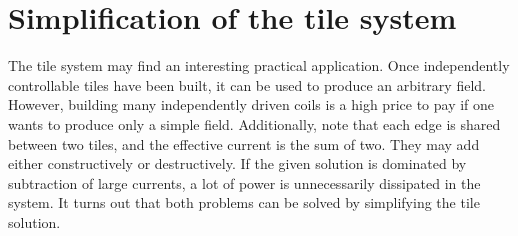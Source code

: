 

\section{Simplification of the tile system}
The tile system may find an interesting practical application. Once independently controllable tiles have been built, it can be used to produce an arbitrary field. However, building many independently driven coils is a high price to pay if one wants to produce only a simple field. Additionally, note that each edge is shared between two tiles, and the effective current is the sum of two. They may add either constructively or destructively. If the given solution is dominated by subtraction of large currents, a lot of power is unnecessarily dissipated in the system. It turns out that both problems can be solved by simplifying the tile solution.

